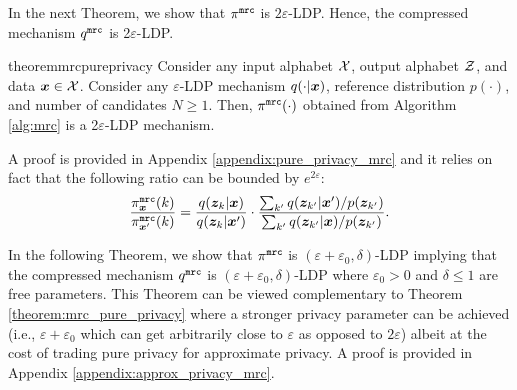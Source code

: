 In the next Theorem, we show that $\pi^{\texttt{mrc}}$ is $2\varepsilon$-LDP. Hence, the compressed mechanism $q^{\texttt{mrc}}$ is 2$\varepsilon$-LDP. 
\begin{restatable}{theorem}{mrcpureprivacy}\label{theorem:mrc_pure_privacy}
Consider any input alphabet $\mathcal{X}$, output alphabet $\mathcal{Z}$, and data ${\boldsymbol{x}} \in \mathcal{X}$.
Consider any $\varepsilon$-LDP mechanism $q(\cdot|{\boldsymbol{x}})$, reference distribution $p(\cdot)$, and number of candidates $N\geq 1$. Then, $\pi^{\texttt{mrc}}(\cdot)$ obtained from Algorithm \ref{alg:mrc} is a  2$\varepsilon$-LDP mechanism.
\end{restatable}
A proof is provided in Appendix \ref{appendix:pure_privacy_mrc} and it relies on fact that the following ratio can be bounded by $e^{2\varepsilon}$:
 \begin{align}
    \frac{\pi^{\texttt{mrc}}_{{\boldsymbol{x}}}(k)}{\pi^{\texttt{mrc}}_{{\boldsymbol{x}}'}(k)} = \frac{q({\boldsymbol{z}}_k | {\boldsymbol{x}})}{q({\boldsymbol{z}}_k | {\boldsymbol{x}}')} \cdot \frac{\sum_{k'} q({\boldsymbol{z}}_{k'} | {\boldsymbol{x}}')/p({\boldsymbol{z}}_{k'})}{\sum_{k'} q({\boldsymbol{z}}_{k'} | {\boldsymbol{x}})/p({\boldsymbol{z}}_{k'})}.
\end{align}


In the following Theorem, we show that $\pi^{\texttt{mrc}}$ is $(\varepsilon + \varepsilon_0, \delta)$-LDP implying that the compressed mechanism $q^{\texttt{mrc}}$ is $(\varepsilon + \varepsilon_0, \delta)$-LDP where $\varepsilon_0 > 0$ and $\delta \leq 1$ are free parameters. This Theorem can be viewed complementary to Theorem \ref{theorem:mrc_pure_privacy} where a stronger privacy parameter can be achieved (i.e., $\varepsilon + \varepsilon_0$ which can get arbitrarily close to $\varepsilon$ as opposed to $2\varepsilon$) albeit at the cost of trading pure privacy for approximate privacy. A proof is provided in Appendix \ref{appendix:approx_privacy_mrc}.

